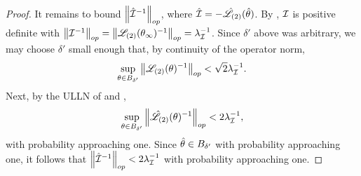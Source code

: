 \begin{lem}
\begin{proof}
It remains to bound $\left\Vert \hat{\mathcal{I}}^{-1}\right\Vert_{op}$, where $\hat{\mathcal{I}} =
-\hat{\mathscr{L}}_{(2)}(\hat\theta)$.  By  , $\mathcal{I}$
is positive definite with $\left\Vert \mathcal{I}^{-1}\right\Vert_{op} =
\left\Vert \mathscr{L}_{(2)}(\theta_{\infty})^{-1}\right\Vert_{op} = \lambda_\mathcal{I}^{-1}$. Since $\delta'$ above was
arbitrary, we may choose $\delta'$ small enough that, by continuity of the
operator norm,
%
\begin{align*}
%
\sup_{\theta \in \thetaball{\delta'}}
    \norm{\likk{2}(\theta)^{-1}}_{op} < \sqrt{2} \infoev^{-1}.
%
\end{align*}
%
Next, by the ULLN of
  and ,
%
\begin{align*}
%
\sup_{\theta \in \thetaball{\delta'}}
    \norm{\likhatk{2}(\theta)^{-1}}_{op} < 2 \infoev^{-1},
%
\end{align*}
%
with probability approaching one.  Since $\hat\theta \in B_{\delta'}$
with probability approaching one, it follows that $\left\Vert \hat{\mathcal{I}}^{-1}\right\Vert_{op} <
2 \lambda_\mathcal{I}^{-1}$ with probability approaching one.



%
\end{proof}
%
\end{lem}


